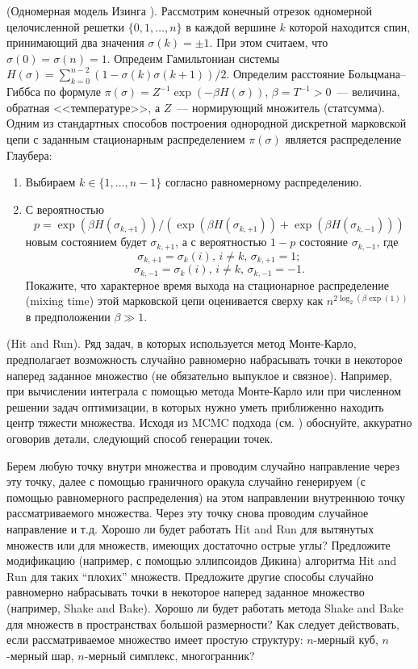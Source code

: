 \begin{problem} (Одномерная модель Изинга \cite{44}). 
Рассмотрим конечный отрезок одномерной целочисленной решетки $\{0,1,\dots,n\}$ в каждой вершине $k$ которой находится спин, принимающий два значения $\sigma(k)=\pm1$. При этом считаем, что $\sigma(0)=\sigma(n)=1$. Опредеим Гамильтониан системы $H(\sigma) = \sum_{k=0}^{n-2}(1-\sigma(k)\sigma(k+1))/2$. Определим расстояние Больцмана--Гиббса по формуле $\pi(\sigma) = Z^{-1}\exp(-\beta H(\sigma))$, $\beta = T^{-1}>0$~--- величина, обратная <<температуре>>, а $Z$~--- нормирующий множитель (статсумма). Одним из стандартных способов построения однородной дискретной марковской цепи с заданным стационарным распределением $\pi(\sigma)$ является распределение Глаубера:
\begin{enumerate}
\item Выбираем $k\in\{1,\dots,n-1\}$ согласно равномерному распределению.
\item С вероятностью $$p=\exp(\beta H(\sigma_{k,+1}))/\left(\exp(\beta H(\sigma_{k,+1}))+\exp(\beta H(\sigma_{k,-1}))\right)$$ новым состоянием будет $\sigma_{k,+1}$, а с вероятностью $1-p$ состояние  $\sigma_{k,-1}$,
где $$\sigma_{k,+1} = \sigma_{k}(i),\,i\not=k,\,\sigma_{k,+1} = 1;$$
$$\sigma_{k,-1} = \sigma_{k}(i),\,i\not=k,\,\sigma_{k,-1} = -1.$$
Покажите, что характерное время выхода на стационарное распределение (mixing time) 
этой марковской цепи оценивается сверху как $n^{2\log_2(\beta\exp(1))}$ в предположении $\beta \gg 1$.
\end{enumerate}
\end{problem}


\begin{problem}\Star (Hit and Run).
Ряд задач, в которых используется метод Монте-Карло, предполагает возможность случайно равномерно набрасывать точки в некоторое наперед заданное множество (не обязательно выпуклое и связное). Например, при вычислении интеграла с помощью метода
Монте-Карло или при численном решении задач оптимизации, в которых нужно уметь
приближенно находить центр тяжести множества. Исходя из MCMC подхода (см. \cite{240}) обоснуйте,
аккуратно оговорив детали, следующий способ генерации точек.

Берем любую точку внутри множества и проводим случайно направление через эту точку, далее с помощью
граничного оракула случайно генерируем (с помощью равномерного распределения) на
этом направлении внутреннюю точку рассматриваемого множества. Через эту точку снова
проводим случайное направление и т.д. Хорошо ли будет работать Hit and Run для вытянутых множеств или для множеств, имеющих достаточно острые углы? Предложите модификацию (например, с помощью эллипсоидов Дикина) алгоритма Hit and Run для таких “плохих” множеств. Предложите другие способы случайно равномерно набрасывать точки в некоторое наперед заданное множество (например, Shake and Bake). Хорошо ли будет работать метода Shake and Bake для множеств в пространствах большой размерности? Как следует действовать, если рассматриваемое множество имеет простую структуру: $n$-мерный куб, $n$-мерный шар, $n$-мерный симплекс, многогранник?
\end{problem}

